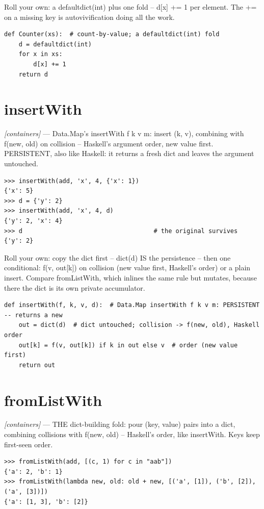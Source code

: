 \documentclass[11pt,letterpaper]{book}
\begin{document}
Roll your own: a defaultdict(int) plus one fold -- d[x] += 1 per element. The += on a missing key is autovivification doing all the work.

\begin{lstlisting}[style=code]
def Counter(xs):  # count-by-value; a defaultdict(int) fold
    d = defaultdict(int)
    for x in xs:
        d[x] += 1
    return d
\end{lstlisting}

\section{insertWith}
\noindent\textit{[containers]} --- Data.Map's insertWith f k v m: insert (k, v), combining with f(new, old) on collision -- Haskell's argument order, new value first. PERSISTENT, also like Haskell: it returns a fresh dict and leaves the argument untouched.
\begin{lstlisting}[style=spec]
>>> insertWith(add, 'x', 4, {'x': 1})
{'x': 5}
>>> d = {'y': 2}
>>> insertWith(add, 'x', 4, d)
{'y': 2, 'x': 4}
>>> d                                    # the original survives
{'y': 2}
\end{lstlisting}

Roll your own: copy the dict first -- dict(d) IS the persistence -- then one conditional: f(v, out[k]) on collision (new value first, Haskell's order) or a plain insert. Compare fromListWith, which inlines the same rule but mutates, because there the dict is its own private accumulator.

\begin{lstlisting}[style=code]
def insertWith(f, k, v, d):  # Data.Map insertWith f k v m: PERSISTENT -- returns a new
    out = dict(d)  # dict untouched; collision -> f(new, old), Haskell order
    out[k] = f(v, out[k]) if k in out else v  # order (new value first)
    return out
\end{lstlisting}

\section{fromListWith}
\noindent\textit{[containers]} --- THE dict-building fold: pour (key, value) pairs into a dict, combining collisions with f(new, old) -- Haskell's order, like insertWith. Keys keep first-seen order.
\begin{lstlisting}[style=spec]
>>> fromListWith(add, [(c, 1) for c in "aab"])
{'a': 2, 'b': 1}
>>> fromListWith(lambda new, old: old + new, [('a', [1]), ('b', [2]), ('a', [3])])
{'a': [1, 3], 'b': [2]}
\end{lstlisting}
\end{document}
